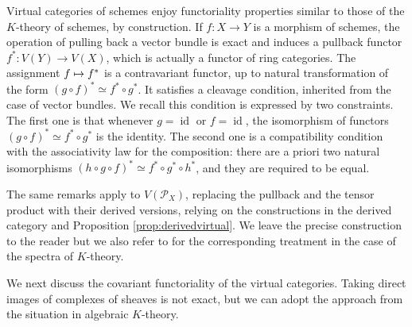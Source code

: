 \documentclass[11pt]{article}
\newcommand\mto{\mathchoice{\longmapsto}{\mapsto}{\mapsto}{\mapsto}}
\theoremstyle{plain}
\theoremstyle{definition}
\newcommand{\Pcal}{\mathcal P}
\DeclareMathOperator{\id}{id}
\begin{document}
Virtual categories of schemes enjoy functoriality properties similar to those of the $K$-theory of schemes, by construction. If $f\colon X\to Y$ is a morphism of schemes, the operation of pulling back a vector bundle is exact and induces a pullback functor $f^\ast: V(Y) \to V(X)$, which is actually a functor of ring categories. The assignment $f\mto f^{\ast}$ is a contravariant functor, up to natural transformation of the form $(g\circ f)^{\ast}\simeq f^{\ast}\circ g^{\ast}$. It satisfies a cleavage condition, inherited from the case of vector bundles. We recall this condition is expressed by two constraints. The first one is that whenever $g=\id$ or $f=\id$, the isomorphism of functors $(g\circ f)^{\ast}\simeq f^{\ast}\circ g^{\ast}$ is the identity. The second one is a compatibility condition with the associativity law for the composition: there are a priori two natural isomorphisms $(h\circ g\circ f)^{\ast}\simeq f^{\ast}\circ g^{\ast}\circ h^{\ast}$, and they are required to be equal.

The same remarks apply to $V(\Pcal_X)$, replacing the pullback and the tensor product with their derived versions, relying on the constructions in the derived category and Proposition \ref{prop:derivedvirtual}. We leave the precise construction to the reader but we also refer to \cite[, ]{ThomasonTrobaugh} for the corresponding treatment in the case of the spectra of $K$-theory.

We next discuss the covariant functoriality of the virtual categories. Taking direct images of complexes of sheaves is not exact, but we can adopt the approach from the situation in algebraic $K$-theory.
\end{document}
